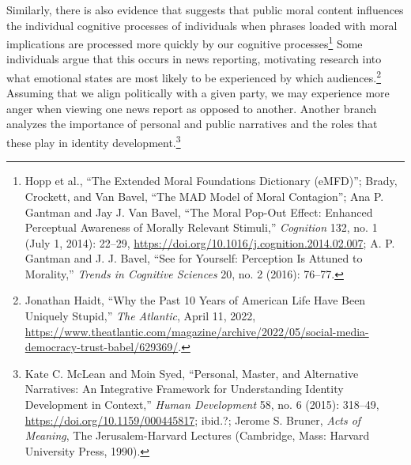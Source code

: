 \documentclass[phdthesis,12pt,final]{wuthesis}
\theoremstyle{definition}
\theoremstyle{definition}
\theoremstyle{definition}
\theoremstyle{definition}
\theoremstyle{remark}
\begin{document}
Similarly, there is also evidence that suggests that public moral content influences the individual cognitive processes of individuals when phrases loaded with moral implications are processed more quickly by our cognitive processes\footnote{Hopp et al., {``The Extended {Moral Foundations Dictionary} ({eMFD})''}; Brady, Crockett, and Van Bavel, {``The {MAD} Model of Moral Contagion''}; Ana P. Gantman and Jay J. Van Bavel, {``The Moral Pop-Out Effect: {Enhanced} Perceptual Awareness of Morally Relevant Stimuli,''} \emph{Cognition} 132, no. 1 (July 1, 2014): 22--29, \url{https://doi.org/10.1016/j.cognition.2014.02.007}; A. P. Gantman and J. J. Bavel, {``See for Yourself: Perception Is Attuned to Morality,''} \emph{Trends in Cognitive Sciences} 20, no. 2 (2016): 76--77.} Some individuals argue that this occurs in news reporting, motivating research into what emotional states are most likely to be experienced by which audiences.\footnote{Jonathan Haidt, {``Why the {Past} 10 {Years} of {American Life Have Been Uniquely Stupid},''} \emph{The Atlantic}, April 11, 2022, \url{https://www.theatlantic.com/magazine/archive/2022/05/social-media-democracy-trust-babel/629369/}.} Assuming that we align politically with a given party, we may experience more anger when viewing one news report as opposed to another. Another branch analyzes the importance of personal and public narratives and the roles that these play in identity development.\footnote{Kate C. McLean and Moin Syed, {``Personal, {Master}, and {Alternative Narratives}: {An Integrative Framework} for {Understanding Identity Development} in {Context},''} \emph{Human Development} 58, no. 6 (2015): 318--49, \url{https://doi.org/10.1159/000445817}; ibid.?; Jerome S. Bruner, \emph{Acts of Meaning}, The {Jerusalem-Harvard} Lectures (Cambridge, Mass: Harvard University Press, 1990).}
\end{document}
